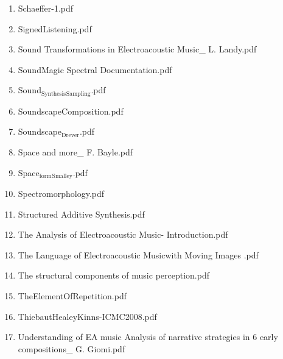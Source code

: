 \documentclass[11pt]{article}
\begin{document}
\begin{enumerate}
\begin{enumerate}
\item Schaeffer-1.pdf
\label{sec-1-1-1-1-11-19-29-1-49}

\item SignedListening.pdf
\label{sec-1-1-1-1-11-19-29-1-50}

\item Sound Transformations in Electroacoustic Music\_ L. Landy.pdf
\label{sec-1-1-1-1-11-19-29-1-51}

\item SoundMagic Spectral Documentation.pdf
\label{sec-1-1-1-1-11-19-29-1-52}

\item Sound$_{\text{Synthesis}}$$_{\text{Sampling}}$.pdf
\label{sec-1-1-1-1-11-19-29-1-53}

\item SoundscapeComposition.pdf
\label{sec-1-1-1-1-11-19-29-1-54}

\item Soundscape$_{\text{Drever}}$.pdf
\label{sec-1-1-1-1-11-19-29-1-55}

\item Space and more\_ F. Bayle.pdf
\label{sec-1-1-1-1-11-19-29-1-56}

\item Space$_{\text{form}}$$_{\text{Smalley}}$.pdf
\label{sec-1-1-1-1-11-19-29-1-57}

\item Spectromorphology.pdf
\label{sec-1-1-1-1-11-19-29-1-58}

\item Structured Additive Synthesis.pdf
\label{sec-1-1-1-1-11-19-29-1-59}

\item The Analysis of Electroacoustic Music- Introduction.pdf
\label{sec-1-1-1-1-11-19-29-1-60}

\item The Language of Electroacoustic Musicwith Moving Images  .pdf
\label{sec-1-1-1-1-11-19-29-1-61}

\item The structural components of music perception.pdf
\label{sec-1-1-1-1-11-19-29-1-62}

\item TheElementOfRepetition.pdf
\label{sec-1-1-1-1-11-19-29-1-63}

\item ThiebautHealeyKinns-ICMC2008.pdf
\label{sec-1-1-1-1-11-19-29-1-64}

\item Understanding of EA music Analysis of narrative strategies in 6 early compositions\_ G. Giomi.pdf
\label{sec-1-1-1-1-11-19-29-1-65}


\end{enumerate}
\end{enumerate}
\end{document}
